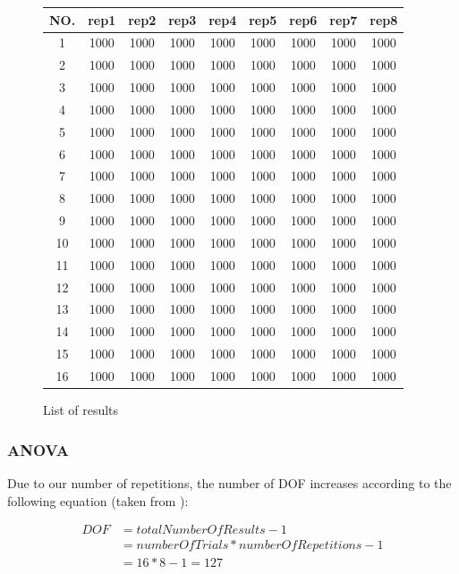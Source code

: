 \begin{figure}[H]
	\centering
	\begin{tabular}{ |c||c|c|c|c|c|c|c|c|  }
		\hline
		NO.& rep1 & rep2 & rep3 & rep4 & rep5 & rep6 & rep7 & rep8\\
		\hline
		1  & 1000 & 1000 & 1000 & 1000 & 1000 & 1000 & 1000 & 1000\\
		2  & 1000 & 1000 & 1000 & 1000 & 1000 & 1000 & 1000 & 1000\\
		3  & 1000 & 1000 & 1000 & 1000 & 1000 & 1000 & 1000 & 1000\\
		4  & 1000 & 1000 & 1000 & 1000 & 1000 & 1000 & 1000 & 1000\\
		5  & 1000 & 1000 & 1000 & 1000 & 1000 & 1000 & 1000 & 1000\\
		6  & 1000 & 1000 & 1000 & 1000 & 1000 & 1000 & 1000 & 1000\\
		7  & 1000 & 1000 & 1000 & 1000 & 1000 & 1000 & 1000 & 1000\\
		8  & 1000 & 1000 & 1000 & 1000 & 1000 & 1000 & 1000 & 1000\\
		9  & 1000 & 1000 & 1000 & 1000 & 1000 & 1000 & 1000 & 1000\\
		10 & 1000 & 1000 & 1000 & 1000 & 1000 & 1000 & 1000 & 1000\\
		11 & 1000 & 1000 & 1000 & 1000 & 1000 & 1000 & 1000 & 1000\\
		12 & 1000 & 1000 & 1000 & 1000 & 1000 & 1000 & 1000 & 1000\\
		13 & 1000 & 1000 & 1000 & 1000 & 1000 & 1000 & 1000 & 1000\\
		14 & 1000 & 1000 & 1000 & 1000 & 1000 & 1000 & 1000 & 1000\\
		15 & 1000 & 1000 & 1000 & 1000 & 1000 & 1000 & 1000 & 1000\\
		16 & 1000 & 1000 & 1000 & 1000 & 1000 & 1000 & 1000 & 1000\\
		\hline
	\end{tabular}
	\caption{List of results}
\end{figure}



\subsubsection{ANOVA}

Due to our number of repetitions, the number of DOF increases according to the following equation (taken from \cite{roy_primer_1990}):

\begin{equation} \label{full DOF}
	\begin{split}
		DOF & = totalNumberOfResults - 1 \\
		& = numberOfTrials * numberOfRepetitions - 1 \\
		& = 16 * 8 - 1 = 127
	\end{split}
\end{equation}



